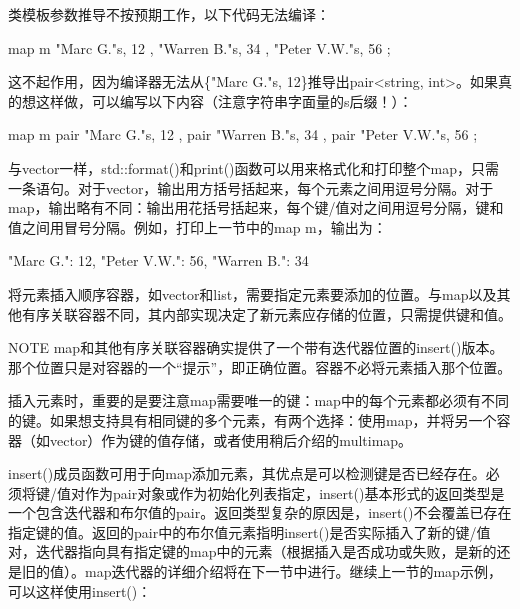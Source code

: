 类模板参数推导不按预期工作，以下代码无法编译：

\begin{cpp}
map m {
    { "Marc G."s, 12 }, { "Warren B."s, 34 }, { "Peter V.W."s, 56 }
};
\end{cpp}

这不起作用，因为编译器无法从\{"Marc G."s, 12\}推导出pair<string, int>。如果真的想这样做，可以编写以下内容（注意字符串字面量的s后缀！）：

\begin{cpp}
map m {
    pair { "Marc G."s, 12 }, pair { "Warren B."s, 34 }, pair { "Peter V.W."s, 56 }
};
\end{cpp}



与vector一样，std::format()和print()函数可以用来格式化和打印整个map，只需一条语句。对于vector，输出用方括号括起来，每个元素之间用逗号分隔。对于map，输出略有不同：输出用花括号括起来，每个键/值对之间用逗号分隔，键和值之间用冒号分隔。例如，打印上一节中的map m，输出为：

\begin{cpp}
{"Marc G.": 12, "Peter V.W.": 56, "Warren B.": 34}
\end{cpp}


将元素插入顺序容器，如vector和list，需要指定元素要添加的位置。与map以及其他有序关联容器不同，其内部实现决定了新元素应存储的位置，只需提供键和值。

\begin{myNotic}{NOTE}
map和其他有序关联容器确实提供了一个带有迭代器位置的insert()版本。那个位置只是对容器的一个“提示”，即正确位置。容器不必将元素插入那个位置。
\end{myNotic}

插入元素时，重要的是要注意map需要唯一的键：map中的每个元素都必须有不同的键。如果想支持具有相同键的多个元素，有两个选择：使用map，并将另一个容器（如vector）作为键的值存储，或者使用稍后介绍的multimap。


insert()成员函数可用于向map添加元素，其优点是可以检测键是否已经存在。必须将键/值对作为pair对象或作为初始化列表指定，insert()基本形式的返回类型是一个包含迭代器和布尔值的pair。返回类型复杂的原因是，insert()不会覆盖已存在指定键的值。返回的pair中的布尔值元素指明insert()是否实际插入了新的键/值对，迭代器指向具有指定键的map中的元素（根据插入是否成功或失败，是新的还是旧的值）。map迭代器的详细介绍将在下一节中进行。继续上一节的map示例，可以这样使用insert()：

